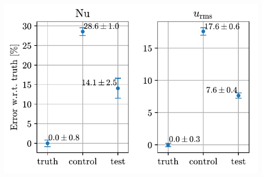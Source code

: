 \documentclass[12pt, aspectratio=169]{beamer}
\begin{document}
\begin{frame}
    \centering
    \includegraphics[height=0.99\textheight]{figures/stats.pdf}
\end{frame}
\end{document}

